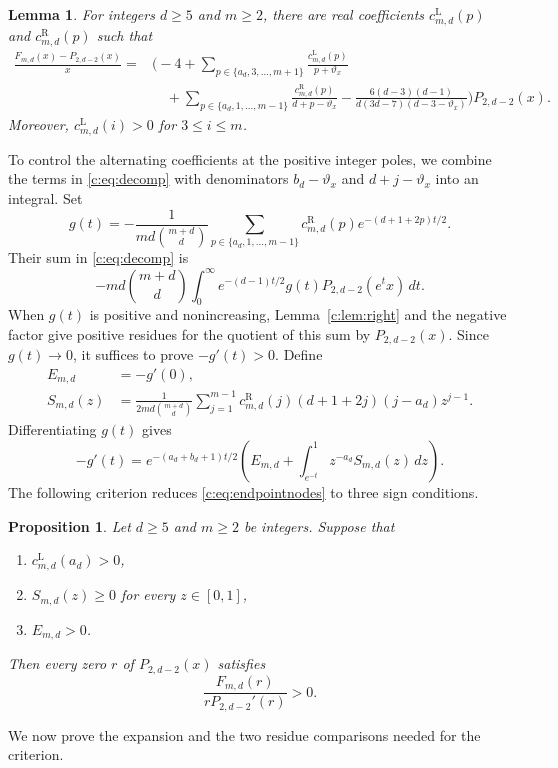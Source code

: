 \documentclass[11pt]{article}
\numberwithin{equation}{section}
\newtheorem{lemma}[theorem]{Lemma}
\newtheorem{proposition}[theorem]{Proposition}
\theoremstyle{remark}\newtheorem{remark}[theorem]{Remark}
\newcommand{\varthetax}{\vartheta_x}
\begin{document}
\enlargethispage{\baselineskip}
\begin{lemma}\label{c:lem:decomposition}
For integers $d\ge5$ and $m\ge2$, there are real coefficients
$c_{m,d}^{\mathrm L}(p)$ and $c_{m,d}^{\mathrm R}(p)$ such that
\begin{equation}\label{c:eq:decomp}
 \begin{aligned}
 \frac{F_{m,d}(x)-P_{2,d-2}(x)}{x}
 ={}&\biggl(-4+
 \sum_{p\in\{a_d,3,\ldots,m+1\}}
 \frac{c_{m,d}^{\mathrm L}(p)}{p+\varthetax}\\
 &\quad+\sum_{p\in\{a_d,1,\ldots,m-1\}}
 \frac{c_{m,d}^{\mathrm R}(p)}{d+p-\varthetax}
 -\frac{6(d-3)(d-1)}{d(3d-7)(d-3-\varthetax)}\biggr)P_{2,d-2}(x).
 \end{aligned}
\end{equation}
Moreover, $c_{m,d}^{\mathrm L}(i)>0$ for $3\le i\le m$.
\end{lemma}
\pagebreak[3]
To control the alternating coefficients at the positive integer poles,
we combine the terms in \eqref{c:eq:decomp} with denominators
$b_d-\varthetax$ and $d+j-\varthetax$ into an integral. Set
\[
 g(t)=-\frac1{md\binom{m+d}{d}}
 \sum_{p\in\{a_d,1,\ldots,m-1\}}
 c_{m,d}^{\mathrm R}(p)e^{-(d+1+2p)t/2}.
\]
Their sum in \eqref{c:eq:decomp} is
\[
 -md\binom{m+d}{d}\int_0^\infty
 e^{-(d-1)t/2}g(t)P_{2,d-2}(e^tx)\,dt.
\]
When $g(t)$ is positive and nonincreasing, Lemma~\ref{c:lem:right} and the
negative factor give positive residues for the quotient of this sum
by $P_{2,d-2}(x)$.
Since $g(t)\to0$, it suffices to prove $-g'(t)>0$. Define
\begin{align*}
 E_{m,d}&=-g'(0),\\
 S_{m,d}(z)&=\frac1{2md\binom{m+d}{d}}\sum_{j=1}^{m-1}
 c_{m,d}^{\mathrm R}(j)(d+1+2j)(j-a_d)z^{j-1}.
\end{align*}
Differentiating $g(t)$ gives
\begin{equation}\label{c:eq:weightderivative}
 -g'(t)=e^{-(a_d+b_d+1)t/2}
 \left(E_{m,d}+\int_{e^{-t}}^1z^{-a_d}S_{m,d}(z)\,dz\right).
\end{equation}
The following criterion reduces \eqref{c:eq:endpointnodes} to three
sign conditions.

\begin{proposition}\label{c:th:criterion}
Let $d\ge5$ and $m\ge2$ be integers. Suppose that
\begin{enumerate}
\renewcommand{\theenumi}{\roman{enumi}}
\renewcommand{\labelenumi}{(\theenumi)}
\item\label{c:cond:left} $c_{m,d}^{\mathrm L}(a_d)>0$,
\item\label{c:cond:kernel} $S_{m,d}(z)\ge0$ for every $z\in[0,1]$,
\item\label{c:cond:gap} $E_{m,d}>0$.
\end{enumerate}
Then every zero $r$ of $P_{2,d-2}(x)$ satisfies
\[
 \frac{F_{m,d}(r)}{rP_{2,d-2}'(r)}>0.
\]
\end{proposition}
We now prove the expansion and the two residue comparisons needed for
the criterion.
\end{document}
